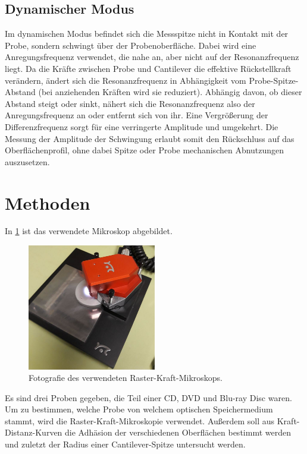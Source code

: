 \documentclass[
	a4paper,
	12pt,
	pagesize,
	ngerman
]{scrartcl}
\begin{document}
	\subsection{Dynamischer Modus}
	Im dynamischen Modus befindet sich die Messspitze nicht in Kontakt mit der Probe, sondern schwingt über der Probenoberfläche.
	Dabei wird eine Anregungsfrequenz verwendet, die nahe an, aber nicht auf der Resonanzfrequenz liegt.
	Da die Kräfte zwischen Probe und Cantilever die effektive Rückstellkraft verändern, ändert sich die Resonanzfrequenz in Abhängigkeit vom Probe-Spitze-Abstand (bei anziehenden Kräften wird sie reduziert).
	Abhängig davon, ob dieser Abstand steigt oder sinkt, nähert sich die Resonanzfrequenz also der Anregungsfrequenz an oder entfernt sich von ihr.
	Eine Vergrößerung der Differenzfrequenz sorgt für eine verringerte Amplitude und umgekehrt.
	Die Messung der Amplitude der Schwingung erlaubt somit den Rückschluss auf das Oberflächenprofil, ohne dabei Spitze oder Probe mechanischen Abnutzungen auszusetzen.

	\section{Methoden}
	\label{sec_methoden}
	In \cref{fig_Foto} ist das verwendete Mikroskop abgebildet.
	\begin{figure}[H]
		\includegraphics[width=0.5\textwidth]{images/afm}
		\centering
		\caption{Fotografie des verwendeten Raster-Kraft-Mikroskops.}
		\label{fig_Foto}
		\centering
	\end{figure}

	Es sind drei Proben gegeben, die Teil einer CD, DVD und Blu-ray Disc waren.
	Um zu bestimmen, welche Probe von welchem optischen Speichermedium stammt, wird die Raster-Kraft-Mikroskopie verwendet.
	Außerdem soll aus Kraft-Distanz-Kurven die Adhäsion der verschiedenen Oberflächen bestimmt werden und zuletzt der Radius einer Cantilever-Spitze untersucht werden.
\end{document}
